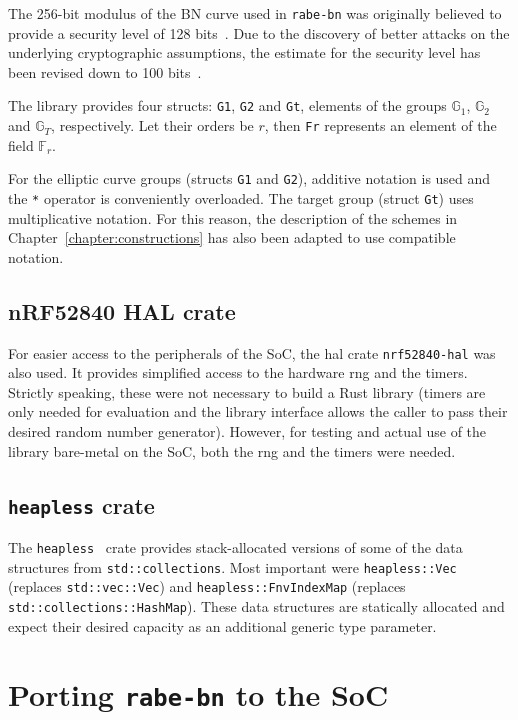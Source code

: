 The 256-bit modulus of the BN curve used in \texttt{rabe-bn} was originally believed to provide a security level of 128 bits~\cite{ben-sasson_succinct_2013}. 
Due to the discovery of better attacks on the underlying cryptographic assumptions, the estimate for the security level has been revised down to 100 bits~\cite{yonezawa_pairing-friendly_2019}.

The library provides four structs: \texttt{G1}, \texttt{G2} and \texttt{Gt}, elements of the groups $\mathbb{G}_1$, $\mathbb{G}_2$ and $\mathbb{G}_T$, respectively.
Let their orders be $r$, then \texttt{Fr} represents an element of the field $\mathbb{F}_r$.

For the elliptic curve groups (structs \texttt{G1} and \texttt{G2}), additive notation is used and the \texttt{*} operator is conveniently overloaded.
The target group (struct \texttt{Gt}) uses multiplicative notation.
For this reason, the description of the schemes in Chapter~\ref{chapter:constructions} has also been adapted to use compatible notation.

\subsection*{nRF52840 HAL crate}
For easier access to the peripherals of the SoC, the \acrfull{hal} \gls{crate} \texttt{nrf52840-hal} was also used.
It provides simplified access to the hardware \acrfull{rng} and the timers.
Strictly speaking, these were not necessary to build a Rust library (timers are only needed for evaluation and the library interface allows the caller to pass their desired random number generator).
However, for testing and actual use of the library bare-metal on the SoC, both the \acrshort{rng} and the timers were needed. %

\subsection*{\texttt{heapless} crate}
The \texttt{heapless}~\cite{aparicio_heapless_nodate} crate provides stack-allocated versions of some of the data structures from \texttt{std::collections}. 
Most important were \texttt{heapless::Vec} (replaces \texttt{std::vec::Vec}) and \texttt{heapless::FnvIndexMap} (replaces \texttt{std::collections::HashMap}).
These data structures are statically allocated and expect their desired capacity as an additional generic type parameter.

\section{Porting \texttt{rabe-bn} to the SoC}

